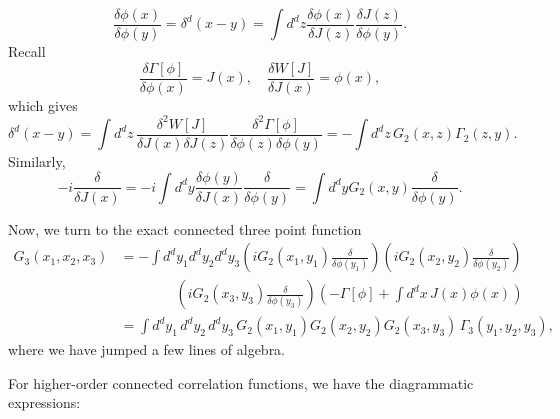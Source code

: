 \begin{solution}
    \begin{equation}
        \frac{\delta \phi(x)}{\delta \phi(y)} = \delta^d(x-y) = \int d^dz\frac{\delta\phi(x)}{\delta J(z)}\frac{\delta J(z)}{\delta \phi(y)} .
    \end{equation}
    Recall
    \begin{equation}
        \frac{\delta\Gamma[\phi]}{\delta\phi(x)} = J(x) ,\quad \frac{\delta W[J]}{\delta J (x)} = \phi(x),
    \end{equation}
    which gives
    \begin{equation}
        \delta^d (x-y) = \int d^dz \,\frac{\delta^2 W[J]}{\delta J(x)\delta J(z)}\frac{\delta^2\Gamma[\phi]}{\delta \phi(z) \delta \phi(y)} = -\int d^dz \, G_2(x,z)\Gamma_2(z,y).
    \end{equation}
    Similarly,
    \begin{equation}
        -i\frac{\delta}{\delta J(x)} = -i\int d^dy \frac{\delta\phi(y)}{\delta J(x)}\frac{\delta}{\delta\phi(y)} = \int d^dy G_2(x,y) \frac{\delta}{\delta\phi(y)}.
    \end{equation}

    Now, we turn to the exact connected three point function
    \begin{equation}
    \begin{aligned}
        G_3(x_1,x_2,x_3) &= -\int d^dy_1d^dy_2d^dy_3 \left(iG_2(x_1,y_1)\frac{\delta}{\delta \phi(y_1)}\right)\left(iG_2(x_2,y_2)\frac{\delta}{\delta \phi(y_2)}\right) \\
        &\qquad \qquad\left(iG_2(x_3,y_3)\frac{\delta}{\delta \phi(y_3)}\right)\left(-\Gamma[\phi] + \int d^dx\,J(x)\phi(x)\right)\\
        &=\int d^dy_1\,d^dy_2\,d^dy_3\, G_2(x_1,y_1)G_2(x_2,y_2)G_2(x_3,y_3)\,\Gamma_3(y_1,y_2,y_3),
    \end{aligned}
    \end{equation}
    where we have jumped a few lines of algebra.

    For higher-order connected correlation functions, we have the diagrammatic expressions:
 

\end{solution}
